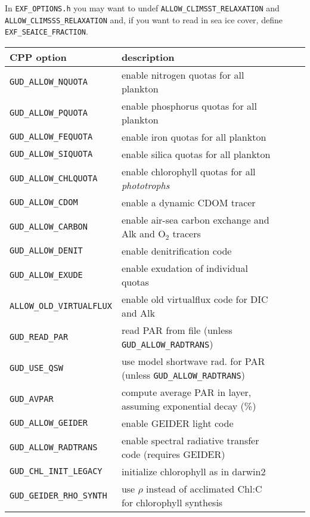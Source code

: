 \documentclass[11pt,letterpaper,english]{article}
\begin{document}
In \verb|EXF_OPTIONS.h| you may want to undef \verb|ALLOW_CLIMSST_RELAXATION|
and \verb|ALLOW_CLIMSSS_RELAXATION| and, if you want to read in sea ice cover,
define \verb|EXF_SEAICE_FRACTION|.

{\renewcommand{\arraystretch}{1.2}
\begin{longtable}[l]{ll>{$}l<{$}l>{$}r<{$}}
\textbf{CPP option} & \textbf{description} \\
\hline
\endhead
  \verb|GUD_ALLOW_NQUOTA|             & enable nitrogen quotas for all plankton \\
  \verb|GUD_ALLOW_PQUOTA|             & enable phosphorus quotas for all plankton \\
  \verb|GUD_ALLOW_FEQUOTA|            & enable iron quotas for all plankton \\
  \verb|GUD_ALLOW_SIQUOTA|            & enable silica quotas for all plankton \\
  \verb|GUD_ALLOW_CHLQUOTA|           & enable chlorophyll quotas for all \emph{phototrophs} \\
  \verb|GUD_ALLOW_CDOM|               & enable a dynamic CDOM tracer \\
  \verb|GUD_ALLOW_CARBON|             & enable air-sea carbon exchange and Alk and O$_2$ tracers \\
  \hline
  \verb|GUD_ALLOW_DENIT|              & enable denitrification code \\
  \verb|GUD_ALLOW_EXUDE|              & enable exudation of individual quotas \\
  \verb|ALLOW_OLD_VIRTUALFLUX|        & enable old virtualflux code for DIC and Alk \\
  \hline
  \verb|GUD_READ_PAR|                 & read PAR from file (unless \verb|GUD_ALLOW_RADTRANS|) \\
  \verb|GUD_USE_QSW|                  & use model shortwave rad. for PAR (unless \verb|GUD_ALLOW_RADTRANS|) \\
  \verb|GUD_AVPAR|                    & compute average PAR in layer, assuming exponential decay (\%) \\
  \verb|GUD_ALLOW_GEIDER|             & enable GEIDER light code \\
  \verb|GUD_ALLOW_RADTRANS|           & enable spectral radiative transfer code (requires GEIDER) \\
  \verb|GUD_CHL_INIT_LEGACY|          & initialize chlorophyll as in darwin2 \\
  \verb|GUD_GEIDER_RHO_SYNTH|         & use $\rho$ instead of acclimated Chl:C for chlorophyll synthesis \\

\end{longtable}}
\end{document}
